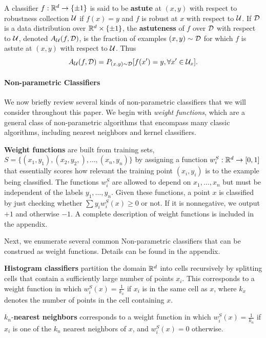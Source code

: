 \begin{defn}
A classifier $f: \mathbb R^d \to \{\pm 1\}$ is said to be \textbf{astute} at $(x,y)$ with respect to robustness collection ${\mathcal U}$ if $f(x) = y$ and $f$ is robust at $x$ with respect to ${\mathcal U}$. If ${\mathcal D}$ is a data distribution over $\mathbb R^d \times \{\pm 1\}$, the \textbf{astuteness} of $f$ over ${\mathcal D}$ with respect to ${\mathcal U}$, denoted $A_{\mathcal U}(f, {\mathcal D})$, is the fraction of examples $(x,y) \sim {\mathcal D}$ for which $f$ is astute at $(x,y)$ with respect to ${\mathcal U}$. Thus $$A_{\mathcal U}(f, {\mathcal D}) = P_{(x, y) \sim {\mathcal D}}[f(x') = y, \forall x' \in {\mathcal U}_x].$$
\end{defn}




\paragraph{Non-parametric Classifiers} We now briefly review several kinds of non-parametric classifiers that we will consider throughout this paper. We begin with \textit{weight functions}, which are a general class of non-parametric algorithms that encompass many classic algorithms, including nearest neighbors and kernel classifiers.

\textbf{Weight functions} are built from training sets, $S = \{(x_1, y_1), (x_2, y_2,), \dots, (x_n, y_n)\}$ by assigning a function $w_i^S: \mathbb R^d \to [0, 1]$ that essentially scores how relevant the training point $(x_i, y_i)$ is to the example being classified. The functions $w_i^S$ are allowed to depend on $x_1, \dots, x_n$ but must be independent of the labels $y_1, \dots, y_n$. Given these functions, a point $x$ is classified by just checking whether $\sum y_iw_i^S(x) \geq 0$ or not. If it is nonnegative, we output $+1$ and otherwise $-1$. A complete description of weight functions is included in the appendix. 

Next, we enumerate several common Non-parametric classifiers that can be construed as weight functions. Details can be found in the appendix.

\textbf{Histogram classifiers} partition the domain $\mathbb R^d$ into cells recursively by splitting cells that contain a sufficiently large number of points $x_i$. This corresponds to a weight function in which $w_i^S(x) = \frac{1}{k_x}$ if $x_i$ is in the same cell as $x$, where $k_x$ denotes the number of points in the cell containing $x$.

$k_n$-\textbf{nearest neighbors} corresponds to a weight function in which $w_i^S(x) = \frac{1}{k_n}$ if $x_i$ is one of the $k_n$ nearest neighbors of $x$, and $w_i^S(x) = 0$ otherwise.

